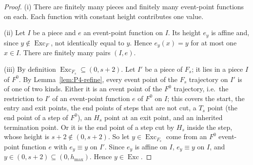 \documentclass[11pt]{amsart}
\newcommand{\Exc}{\operatorname{Exc}}
\newcommand{\hmax}{h_{\max}}
\newcommand{\Fz}{F^{0}}
\newcommand{\Fs}{F_{s}}
\theoremstyle{definition}
\theoremstyle{remark}
\numberwithin{equation}{section}
\begin{document}
\begin{proof}
(i) There are finitely many pieces and finitely many event-point functions on each. Each function with constant height contributes one value.

(ii) Let $I$ be a piece and $e$ an event-point function on $I$. Its height $e_y$ is affine and, since $y\notin\Exc_F$, not identically equal to $y$. Hence $e_y(x)=y$ for at most one $x\in I$. There are finitely many pairs $(I,e)$.

(iii) By definition $\Exc_{\Fs}\subseteq(0,s+2)$. Let $I'$ be a piece of $\Fs$; it lies in a piece $I$ of $\Fz$. By Lemma~\ref{lem:P4-refine}, every event point of the $\Fs$ trajectory on $I'$ is of one of two kinds. Either it is an event point of the $\Fz$ trajectory, i.e.\ the restriction to $I'$ of an event-point function $e$ of $\Fz$ on $I$; this covers the start, the entry and exit points, the end points of steps that are not cut, a $T_s$ point (the end point of a step of $\Fz$), an $H_s$ point at an exit point, and an inherited termination point. Or it is the end point of a step cut by $H_s$ inside the step, whose height is $s+2\notin(0,s+2)$. So let $y\in\Exc_{\Fs}$ come from an $\Fz$ event-point function $e$ with $e_y\equiv y$ on $I'$. Since $e_y$ is affine on $I$, $e_y\equiv y$ on $I$, and $y\in(0,s+2)\subseteq(0,\hmax)$. Hence $y\in\Exc$.


\end{proof}
\end{document}
